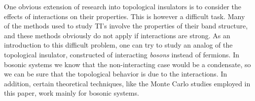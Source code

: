 One obvious extension of research into topological insulators is to consider the effects of interactions on their properties. This is however a difficult task. Many of the methods used to study TI's involve the properties of their band structure, and these methods obviously do not apply if interactions are strong. As an introduction to this difficult problem, one can try to study an analog of the topological insulator, constructed of interacting {\em bosons} instead of fermions. In bosonic systems we know that the non-interacting case would be a condensate, so we can be sure that the topological behavior is due to the interactions. In addition, certain theoretical techniques, like the Monte Carlo studies employed in this paper, work mainly for bosonic systems.


